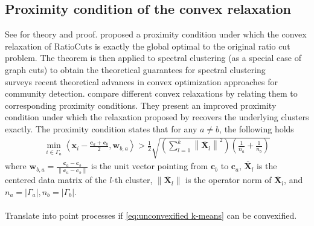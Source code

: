 
	\subsection{Proximity condition of the convex relaxation}\label{sec:proximity condition}
		See \citet{Ling2019,Li2017,Peng2005,Zhao2012} for theory and proof.
		\citet{Ling2019} proposed a proximity condition under which the convex relaxation of RatioCuts is exactly the global optimal to the original ratio cut problem. The theorem is then applied to spectral clustering {(as a special case of graph cuts)} to obtain the theoretical guarantees for spectral clustering
		\\
		\citet{Li2018} surveys recent theoretical advances in convex optimization approaches for community detection.
		\citet{Li2017} compare different convex relaxations by relating them to corresponding proximity conditions. They present an improved proximity condition under which the relaxation proposed by \citet{Peng2005} recovers the underlying clusters exactly.
		The proximity condition states that for any $a\neq b$, the following holds
		\begin{align*}
		\min _{i\in\Gamma_a}\left\langle \mathbf{x}_{i}-\frac{\mathbf{c}_{a}+\mathbf{c}_{b}}{2}, \mathbf{w}_{b, a}\right\rangle>\frac{1}{2} \sqrt{\left(\sum_{l=1}^{k}\left\|\overline{\mathbf{X}}_{l}\right\|^{2}\right)\left(\frac{1}{n_{a}}+\frac{1}{n_{b}}\right)} 
		\end{align*}
		where $\mathbf{w}_{b,a} = \frac{\mathbf{c}_a - \mathbf{c}_b}{\| \mathbf{c}_a - \mathbf{c}_b \|}$ is the unit vector pointing from $\mathbf{c}_b$ to $\mathbf{c}_a$,
		$\overline{\mathbf{X}}_l$ is the centered data matrix of the $l$-th cluster, $\|\overline{\mathbf{X}}_l\|$  is the operator norm of $\overline{\mathbf{X}}_l$, and $n_a=|\Gamma_a|,n_b=|\Gamma_b|$.
		\\
		\\
		{\color{blue} Translate into point processes if \eqref{eq:unconvexified k-means} can be convexified.}
		


	
		




		

